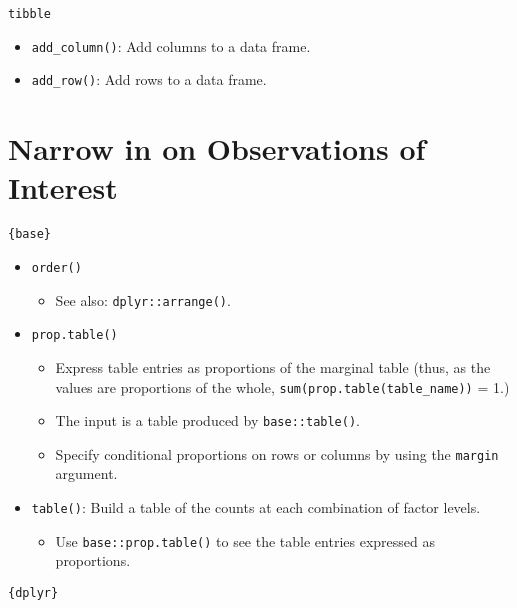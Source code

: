 \documentclass[
]{book}
\providecommand{\tightlist}{%
  \setlength{\itemsep}{0pt}\setlength{\parskip}{0pt}}
\begin{document}
\texttt{tibble}

\begin{itemize}
\tightlist
\item
  \texttt{add\_column()}: Add columns to a data frame.
\item
  \texttt{add\_row()}: Add rows to a data frame.
\end{itemize}

\hypertarget{narrow-in-on-observations-of-interest}{%
\section{Narrow in on Observations of Interest}\label{narrow-in-on-observations-of-interest}}

\texttt{\{base\}}

\begin{itemize}
\tightlist
\item
  \texttt{order()}

  \begin{itemize}
  \tightlist
  \item
    See also: \texttt{dplyr::arrange()}.
  \end{itemize}
\item
  \texttt{prop.table()}

  \begin{itemize}
  \tightlist
  \item
    Express table entries as proportions of the marginal table (thus, as the values are proportions of the whole, \texttt{sum(prop.table(table\_name))} = 1.)
  \item
    The input is a table produced by \texttt{base::table()}.
  \item
    Specify conditional proportions on rows or columns by using the \texttt{margin} argument.
  \end{itemize}
\item
  \texttt{table()}: Build a table of the counts at each combination of factor levels.

  \begin{itemize}
  \tightlist
  \item
    Use \texttt{base::prop.table()} to see the table entries expressed as proportions.
  \end{itemize}
\end{itemize}

\texttt{\{dplyr\}}
\end{document}
